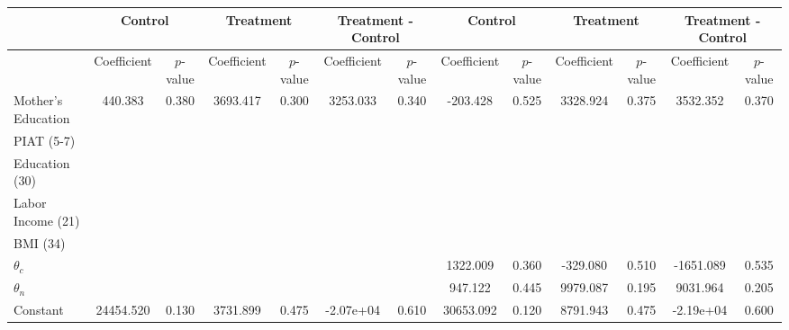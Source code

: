 \begin{tabular}{lcccccccccccc} \toprule
&\multicolumn{2}{c}{Control} & \multicolumn{2}{c}{Treatment} & \multicolumn{2}{c}{Treatment - Control} & \multicolumn{2}{c}{Control} & \multicolumn{2}{c}{Treatment} & \multicolumn{2}{c}{Treatment - Control} \\ \midrule
 & Coefficient  & $p$-value  & Coefficient  & $p$-value & Coefficient  & $p$-value  & Coefficient  & $p$-value  & Coefficient  & $p$-value  & Coefficient  & $p$-value \\ \midrule
Mother's Education &   440.383 &     0.380 &  3693.417 &     0.300 &  3253.033 &     0.340 &  -203.428 &     0.525 &  3328.924 &     0.375 &  3532.352 &     0.370 \\  
PIAT (5-7) &         &         &         &         &         &         &         &         &         &         &         &         \\
Education (30) &         &         &         &         &         &         &         &         &         &         &         &         \\
Labor Income (21) &         &         &         &         &         &         &         &         &         &         &         &         \\
BMI (34) &         &         &         &         &         &         &         &         &         &         &         &         \\
$\theta_{c}$ &         &         &         &         &         &         &  1322.009 &     0.360 &  -329.080 &     0.510 & -1651.089 &     0.535 \\  
$\theta_{n}$ &         &         &         &         &         &         &   947.122 &     0.445 &  9979.087 &     0.195 &  9031.964 &     0.205 \\  
Constant  & 24454.520 &     0.130 &  3731.899 &     0.475 & -2.07e+04 &     0.610 & 30653.092 &     0.120 &  8791.943 &     0.475 & -2.19e+04 &     0.600 \\  
\bottomrule \end{tabular}
